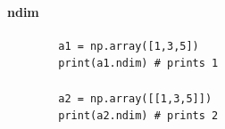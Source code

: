 \paragraph{ndim}
    \begin{verbatim}
        a1 = np.array([1,3,5])
        print(a1.ndim) # prints 1
        
        a2 = np.array([[1,3,5]])
        print(a2.ndim) # prints 2
    \end{verbatim}
